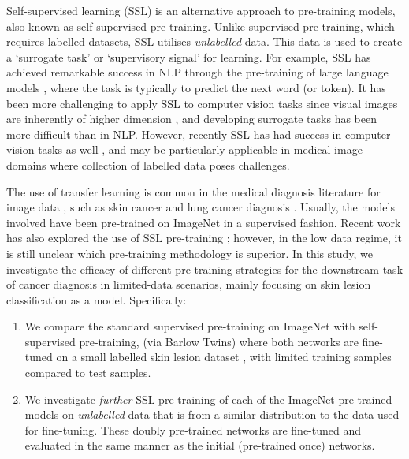 \documentclass[a4paper,fleqn]{cas-dc}
\begin{document}
Self-supervised learning (SSL) \cite{jaiswal2020survey} is an alternative approach to pre-training models, also known as self-supervised pre-training. Unlike supervised pre-training, which requires labelled datasets, SSL utilises \textit{unlabelled} data. This data is used to create a `surrogate task' or `supervisory signal' for learning. For example, SSL has achieved remarkable success in  NLP through the pre-training of large language models \cite{vaswani2017attention,minaee2024largelanguagemodelssurvey}, where the task is typically to predict the next word (or token). It has been more challenging to apply SSL to computer vision tasks since visual images are inherently of higher dimension \cite{lecun2021self}, and developing surrogate tasks has been more difficult than in NLP. However, recently SSL has had success in computer vision tasks as well \cite{jaiswal2020survey,lecun2021self}, and may be particularly applicable in medical image domains where collection of labelled data poses challenges.

The use of transfer learning is common in the medical diagnosis literature for image data \cite{zhuang2020comprehensive}, such as skin cancer \cite{kim2022transfer} and lung cancer diagnosis \cite{Wang2020}. Usually, the models involved have been pre-trained on ImageNet in a supervised fashion. Recent work has also explored the use of SSL pre-training \cite{Huang2023}; however, in the low data regime, it is still unclear which pre-training methodology is superior. In this study, we investigate the efficacy of different pre-training strategies for the downstream task of cancer diagnosis in limited-data scenarios, mainly focusing on skin lesion classification as a model. Specifically:
\begin{enumerate}

\item We compare the standard supervised pre-training on ImageNet with self-supervised pre-training, (via Barlow Twins) where both networks are fine-tuned on a small labelled skin lesion dataset \cite{andrewmvd2019isic}, with limited training samples compared to test samples. 
   
\item We investigate \textit{further} SSL pre-training of each of the ImageNet pre-trained models on \textit{unlabelled} data that is from a similar distribution to the data used for fine-tuning. These doubly pre-trained networks are fine-tuned and evaluated in the same manner as the initial (pre-trained once) networks.
\end{enumerate}
\end{document}
